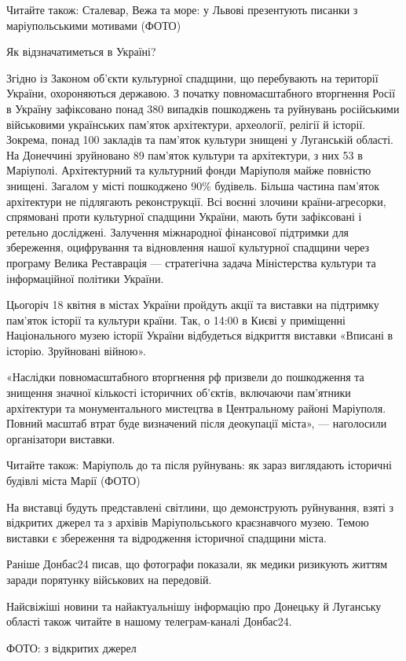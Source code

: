 Читайте також: Сталевар, Вежа та море: у Львові презентують писанки з
маріупольськими мотивами (ФОТО)

Як відзначатиметься в Україні?

Згідно із Законом об'єкти культурної спадщини, що перебувають на території
України, охороняються державою. З початку повномасштабного вторгнення Росії в
Україну зафіксовано понад 380 випадків пошкоджень та руйнувань російськими
військовими українських пам'яток архітектури, археології, релігії й історії.
Зокрема, понад 100 закладів та пам'яток культури знищені у Луганській області.
На Донеччині зруйновано 89 пам'яток культури та архітектури, з них 53 в
Маріуполі. Архітектурний та культурний фонди Маріуполя майже повністю знищені.
Загалом у місті пошкоджено 90\% будівель. Більша частина пам'яток архітектури не
підлягають реконструкції. Всі воєнні злочини країни-агресорки, спрямовані проти
культурної спадщини України, мають бути зафіксовані і ретельно досліджені.
Залучення міжнародної фінансової підтримки для збереження, оцифрування та
відновлення нашої культурної спадщини через програму Велика Реставрація —
стратегічна задача Міністерства культури та інформаційної політики України.

Цьогоріч 18 квітня в містах України пройдуть акції та виставки на підтримку
пам'яток історії та культури країни. Так, о 14:00 в Києві у приміщенні
Національного музею історії України відбудеться відкриття виставки «Вписані в
історію. Зруйновані війною».

«Наслідки повномасштабного вторгнення рф призвели до пошкодження та знищення
значної кількості історичних об'єктів, включаючи пам'ятники архітектури та
монументального мистецтва в Центральному районі Маріуполя. Повний масштаб втрат
буде визначений після деокупації міста», — наголосили організатори виставки.

Читайте також: Маріуполь до та після руйнувань: як зараз виглядають історичні
будівлі міста Марії (ФОТО)

На виставці будуть представлені світлини, що демонструють руйнування, взяті з
відкритих джерел та з архівів Маріупольського краєзнавчого музею. Темою
виставки є збереження та відродження історичної спадщини міста.

Раніше Донбас24 писав, що фотографи показали, як медики ризикують життям заради
порятунку військових на передовій.

Найсвіжіші новини та найактуальнішу інформацію про Донецьку й Луганську області
також читайте в нашому телеграм-каналі Донбас24.

ФОТО: з відкритих джерел
